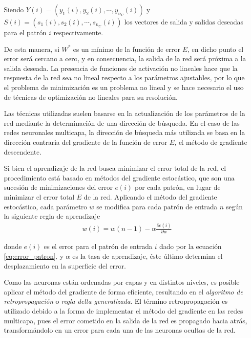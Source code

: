 Siendo $Y(i) = (y_{1}(i), y_{2}(i), \cdots, y_{n_{C}}(i))$ y $S(i) = (s_{1}(i), s_{2}(i), \cdots, s_{n_{C}}(i))$ los vectores de salida y salidas deseadas para el patrón $i$ respectivamente.

De esta manera, si $W^{*}$ es un mínimo de la función de error $E$, en dicho punto el error será cercano a cero, y en consecuencia, la salida de la red será próxima a la salida deseada. La presencia de funciones de activación no lineales hace que la respuesta de la red sea no lineal respecto a los parámetros ajustables, por lo que el problema de minimización es un problema no lineal y se hace necesario el uso de técnicas de optimización no lineales para su resolución.

Las técnicas utilizadas suelen basarse en la actualización de los parámetros de la red mediante la determinación de una dirección de búsqueda. En el caso de las redes neuronales multicapa, la dirección de búsqueda más utilizada se basa en la dirección contraria del gradiente de la función de error $E$, el método de gradiente descendente.

Si bien el aprendizaje de la red busca minimizar el error total de la red, el procedimiento está basado en métodos del gradiente estocástico, que son una sucesión de minimizaciones del error $e(i)$ por cada patrón, en lugar de minimizar el error total $E$ de la red. Aplicando el método del gradiente estocástico, cada parámetro $w$ se modifica para cada patrón de entrada $n$ según la siguiente regla de aprendizaje
\begin{eqnarray}
	w(i) = w(n - 1) - \alpha\frac{\partial e(i)}{\partial w}
\end{eqnarray}

donde $e(i)$ es el error para el patrón de entrada $i$ dado por la ecuación \ref{eq:error_patron}, y $\alpha$ es la tasa de aprendizaje, éste último determina el desplazamiento en la superficie del error.

Como las neuronas están ordenadas por capas y en distintos niveles, es posible aplicar el método del gradiente de forma eficiente, resultando en el {\em algoritmo de retropropagación} \cite{Rumelhart1986} o {\em regla delta generalizada}. El término retropropagación es utilizado debido a la forma de implementar el método del gradiente en las redes multicapa, pues el error cometido en la salida de la red es propagado hacia atrás, transformándolo en un error para cada una de las neuronas ocultas de la red.

